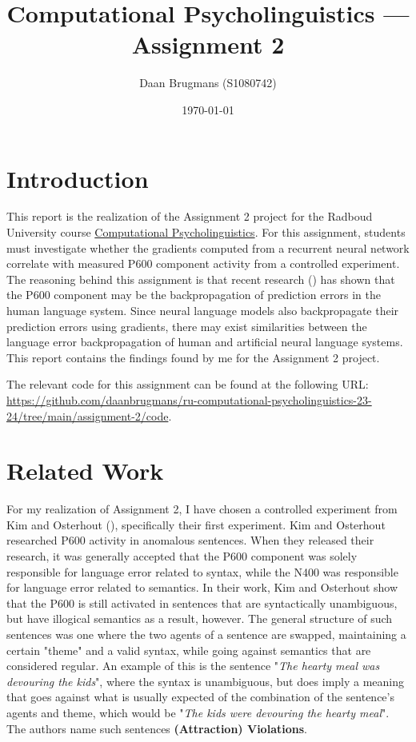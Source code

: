 \documentclass{IEEEtran}
\begin{document}
\title{Computational Psycholinguistics --- Assignment 2}
\author{Daan Brugmans (S1080742)}
\date{\today}

\graphicspath{{./images}}

\maketitle

\section{Introduction}
This report is the realization of the Assignment 2 project for the Radboud University course \href{https://www.ru.nl/courseguides/arts/courses/ma/rema-lc/let-rema-lcex28/}{Computational Psycholinguistics}.
For this assignment, students must investigate whether the gradients computed from a recurrent neural network correlate with measured P600 component activity from a controlled experiment.
The reasoning behind this assignment is that recent research (\cite{fitz2019erp,frank2024gradients}) has shown that the P600 component may be the backpropagation of prediction errors in the human language system.
Since neural language models also backpropagate their prediction errors using gradients, there may exist similarities between the language error backpropagation of human and artificial neural language systems.
This report contains the findings found by me for the Assignment 2 project.

The relevant code for this assignment can be found at the following URL: \url{https://github.com/daanbrugmans/ru-computational-psycholinguistics-23-24/tree/main/assignment-2/code}.

\section{Related Work}
For my realization of Assignment 2, I have chosen a controlled experiment from Kim and Osterhout (\cite{kim2005combinatory}), specifically their first experiment.
Kim and Osterhout researched P600 activity in anomalous sentences.
When they released their research, it was generally accepted that the P600 component was solely responsible for language error related to syntax, while the N400 was responsible for language error related to semantics.
In their work, Kim and Osterhout show that the P600 is still activated in sentences that are syntactically unambiguous, but have illogical semantics as a result, however.
The general structure of such sentences was one where the two agents of a sentence are swapped, maintaining a certain "theme" and a valid syntax, while going against semantics that are considered regular.
An example of this is the sentence "\textit{The hearty meal was devouring the kids}", where the syntax is unambiguous, but does imply a meaning that goes against what is usually expected of the combination of the sentence's agents and theme, which would be "\textit{The kids were devouring the hearty meal}".
The authors name such sentences \textbf{(Attraction) Violations}.
\end{document}
